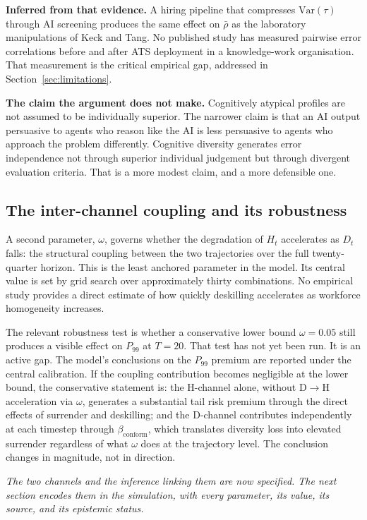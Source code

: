 \documentclass[11pt,a4paper]{article}
\newcommand{\bridgeskip}{\vspace{6pt}}
\begin{document}
\textbf{Inferred from that evidence.} A hiring pipeline that compresses
$\text{Var}(\tau)$ through AI screening produces the same effect on
$\bar{\rho}$ as the laboratory manipulations of Keck and Tang. No published
study has measured pairwise error correlations before and after ATS
deployment in a knowledge-work organisation. That measurement is the
critical empirical gap, addressed in Section~\ref{sec:limitations}.

\textbf{The claim the argument does not make.} Cognitively atypical profiles
are not assumed to be individually superior. The narrower claim is that an AI
output persuasive to agents who reason like the AI is less persuasive to
agents who approach the problem differently. Cognitive diversity generates
error independence not through superior individual judgement but through
divergent evaluation criteria. That is a more modest claim, and a more
defensible one.

\subsection{The inter-channel coupling and its robustness}

A second parameter, $\omega$, governs whether the degradation of $H_t$
accelerates as $D_t$ falls: the structural coupling between the two
trajectories over the full twenty-quarter horizon. This is the least anchored
parameter in the model. Its central value is set by grid search over
approximately thirty combinations. No empirical study provides a direct
estimate of how quickly deskilling accelerates as workforce homogeneity
increases.

The relevant robustness test is whether a conservative lower bound
$\omega = 0.05$ still produces a visible effect on $P_{99}$ at $T = 20$.
That test has not yet been run. It is an active gap. The model's conclusions
on the $P_{99}$ premium are reported under the central calibration. If the
coupling contribution becomes negligible at the lower bound, the conservative
statement is: the H-channel alone, without D$\rightarrow$H acceleration via
$\omega$, generates a substantial tail risk premium through the direct
effects of surrender and deskilling; and the D-channel contributes
independently at each timestep through $\beta_{\text{conform}}$, which
translates diversity loss into elevated surrender regardless of what $\omega$
does at the trajectory level. The conclusion changes in magnitude, not in
direction.

\bridgeskip
\noindent\textit{The two channels and the inference linking them are now
specified. The next section encodes them in the simulation, with every
parameter, its value, its source, and its epistemic status.}
\end{document}

